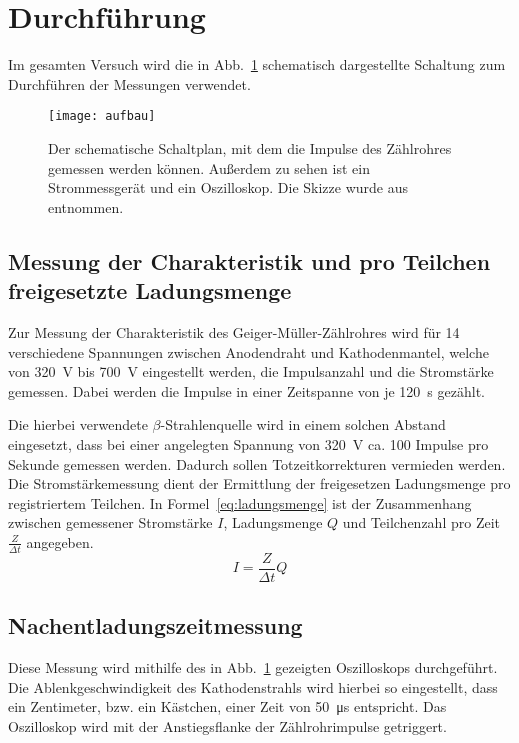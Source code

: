 
\section{Durchführung}
%
Im gesamten Versuch wird die in Abb.~\ref{fig:aufbau} schematisch 
dargestellte Schaltung zum Durchführen der Messungen verwendet.
%
\begin{figure}
  \centering
  \texttt{[image: aufbau]}
  \caption{Der schematische Schaltplan, mit dem die Impulse
               des Zählrohres gemessen werden können. Außerdem zu sehen 
                ist ein Strommessgerät und ein Oszilloskop.
                 Die Skizze wurde aus \textcite{v703} entnommen.}
  \label{fig:aufbau}
\end{figure}
%
\subsection{Messung der Charakteristik und pro Teilchen freigesetzte Ladungsmenge}
%
Zur Messung der Charakteristik des Geiger-Müller-Zählrohres wird für
\num{14} verschiedene Spannungen zwischen Anodendraht und
Kathodenmantel, welche von \SI{320}{\volt} bis \SI{700}{\volt}
eingestellt werden, die Impulsanzahl und die Stromstärke gemessen.
Dabei werden die Impulse in einer Zeitspanne von je \SI{120}{\second}
gezählt.

Die hierbei verwendete $\beta$-Strahlenquelle wird in einem solchen
Abstand eingesetzt, dass bei einer angelegten Spannung von
\SI{320}{\volt} ca. \num{100} Impulse pro Sekunde gemessen
werden. Dadurch sollen Totzeitkorrekturen vermieden werden.  Die
Stromstärkemessung dient der Ermittlung der freigesetzen Ladungsmenge
pro registriertem Teilchen. In Formel~\eqref{eq:ladungsmenge} ist der
Zusammenhang zwischen gemessener Stromstärke $I$, Ladungsmenge $Q$ und
Teilchenzahl pro Zeit $\frac{Z}{\Delta t}$ angegeben.
\begin{equation}
I = \frac{Z}{\Delta t} Q
\label{eq:ladungsmenge}
\end{equation}
%
\subsection{Nachentladungszeitmessung}
%
Diese Messung wird mithilfe des in Abb.~\ref{fig:aufbau} gezeigten
Oszilloskops durchgeführt. Die Ablenkgeschwindigkeit des Kathodenstrahls
wird hierbei so eingestellt, dass ein Zentimeter, bzw. ein Kästchen,
einer Zeit von \SI{50}{\micro\second} entspricht. Das Oszilloskop wird
mit der Anstiegsflanke der Zählrohrimpulse getriggert.

